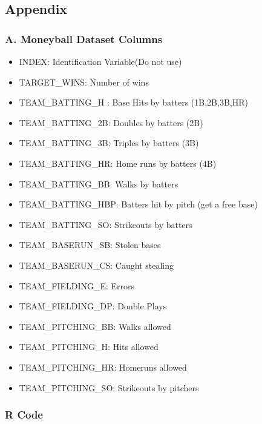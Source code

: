 \documentclass[
]{article}
\providecommand{\tightlist}{%
  \setlength{\itemsep}{0pt}\setlength{\parskip}{0pt}}
\begin{document}
\hypertarget{appendix}{%
\subsection{Appendix}\label{appendix}}

\hypertarget{a.-moneyball-dataset-columns}{%
\subsubsection{A. Moneyball Dataset
Columns}\label{a.-moneyball-dataset-columns}}

\begin{itemize}
\tightlist
\item
  INDEX: Identification Variable(Do not use)
\item
  TARGET\_WINS: Number of wins
\item
  TEAM\_BATTING\_H : Base Hits by batters (1B,2B,3B,HR)
\item
  TEAM\_BATTING\_2B: Doubles by batters (2B)
\item
  TEAM\_BATTING\_3B: Triples by batters (3B)
\item
  TEAM\_BATTING\_HR: Home runs by batters (4B)
\item
  TEAM\_BATTING\_BB: Walks by batters
\item
  TEAM\_BATTING\_HBP: Batters hit by pitch (get a free base)
\item
  TEAM\_BATTING\_SO: Strikeouts by batters
\item
  TEAM\_BASERUN\_SB: Stolen bases
\item
  TEAM\_BASERUN\_CS: Caught stealing
\item
  TEAM\_FIELDING\_E: Errors
\item
  TEAM\_FIELDING\_DP: Double Plays
\item
  TEAM\_PITCHING\_BB: Walks allowed
\item
  TEAM\_PITCHING\_H: Hits allowed
\item
  TEAM\_PITCHING\_HR: Homeruns allowed
\item
  TEAM\_PITCHING\_SO: Strikeouts by pitchers
\end{itemize}

\hypertarget{r-code}{%
\subsubsection{R Code}\label{r-code}}
\end{document}
